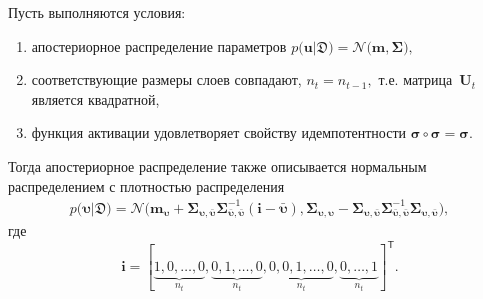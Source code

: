 \begin{theorem}
\label{theorem:ap:layer}
Пусть выполняются условия:
\begin{enumerate}[1)]
\item апостериорное распределение параметров $p\bigr(\mathbf{u}|\mathfrak{D}\bigr) = \mathcal{N}\bigr(\mathbf{m}, \bm{\Sigma}\bigr),$
\item соответствующие размеры слоев совпадают, $n_t=n_{t-1},$ т.е. матрица~$\mathbf{U}_t$ является квадратной,
\item функция активации удовлетворяет свойству идемпотентности $\bm{\sigma} \circ \bm{\sigma} = \bm{\sigma}$.
\end{enumerate}
Тогда апостериорное распределение также описывается нормальным распределением с плотностью распределения
\[
\label{ch:3:eq:ap:5}
\begin{aligned}
p\bigr(\bm{\upsilon}|\mathfrak{D}\bigr) = \mathcal{N}\bigr(\mathbf{m}_{\bm{\upsilon}}+\bm{\Sigma}_{\bm{\upsilon},\bar{\bm{\upsilon}}} \bm{\Sigma}_{\bar{\bm{\upsilon}},\bar{\bm{\upsilon}}}^{-1} \left(\mathbf{i} - \bar{\bm{\upsilon}}\right), \bm{\Sigma}_{\bm{\upsilon},\bm{\upsilon}} - \bm{\Sigma}_{\bm{\upsilon},\bar{\bm{\upsilon}}}\bm{\Sigma}_{\bar{\bm{\upsilon}},\bar{\bm{\upsilon}}}^{-1}\bm{\Sigma}_{\bm{\upsilon},\bar{\bm{\upsilon}}}\bigr),
\end{aligned}
\]
где
\[
\mathbf{i}=[\underbrace{1, 0, \ldots, 0}_{n_t}, \underbrace{0, 1, \ldots, 0}_{n_t}, \underbrace{0, 0, 1, \ldots, 0}_{n_t}, \underbrace{0, \ldots, 1}_{n_t}]^{\mathsf{T}}.
\]
\end{theorem}
